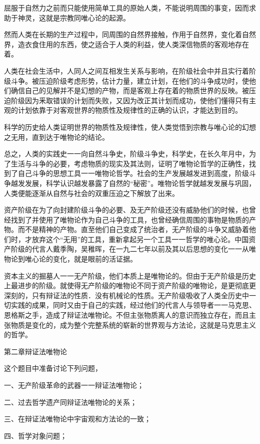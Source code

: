 屈服于自然力之前而只能使用简单工具的原始人类，不能说明周围的事变，因而求助于神灵，这就是宗教同唯心论的起源。

然而人类在长期的生产过程中，同周围的自然界接触，作用于自然界，变化着自然界，造衣食住用的东西，使之适合于人类的利益，使人类深信物质的客观地存在着。

人类在社会生活中，人同人之间互相发生关系与影响，在阶级社会中并且实行着阶级斗争。被压迫阶级考虑形势，估计力量，建立计划，在他们的斗争成功时，使他们确信自己的见解并不是幻想的产物，而是客观上存在着的物质世界的反映。被压迫阶级因为釆取错误的计划而失败，又因为改正其计划而成功，使他们懂得只有主观的计划依靠于对客观世界的物质性及规律性的正确的认识，才能达到目的。

科学的历史给人类证明世界的物质性及规律性，使人类觉悟到宗教与唯心论的幻想之无用，直到达于唯物论的结论。

总之，人类的实践史一一向自然斗争史，阶级斗争史，科学史，在长久年月中，为了生活与斗争的必要，考虑物质的现实及其法则，证明了唯物论哲学的正确性，找到了自己斗争的思想工具一一唯物论哲学。社会的生产发展越发进到高度，阶级斗争越发发展，科学认识越发暴露了自然的“秘密”。唯物论哲学就越发发展与巩固，人类便能逐渐从自然与社会的双重压迫之下解放了出来。

资产阶级在为了向封建阶级斗争的必要、及无产阶级还没有威胁他们的时候，也曾经找到了并使用了唯物论作为自己斗争的工具，也曾经确信周围的事物是物质的产物。而不是精神的产物。直至他们自己变成了统治者，无产阶级的斗争又威胁着他们时，才放弃这个“无用”的工具，重新拿起另一个工具一一哲学的唯心论。中国资产阶级的代言人戴季陶，吴稚晖，在一九二七年以前及其以后思想的变化一一从唯物论到唯心论的变化，就是眼前的活证据。

资本主义的掘墓人一一无产阶级，他们本质上是唯物论的。但由于无产阶级是历史上最进步的阶级。就使得无产阶级的唯物论不同于资产阶级的唯物论，是更彻底更深刻的，只有辩证法的性质．没有机械论的性质。无产阶级吸收了人类全历史中一切实践的成果，同时又由于自己的实践，经过他们的代言人与领导者一一马克思、恩格斯之手，造成了辩证法唯物论。不但主张物质离人的意识而独立存在，而且主张物质是变化的，成为整个完整系统的崭新的世界观与方法论，这就是马克思主义的哲学。

第二章辩证法唯物论

这个题目中准备讨论下列问题，

一、无产阶级革命的武器一一辩证法唯物论；

二、过去哲学遗产同辩证法唯物论的关系；

三、在辩证法唯物论中宇宙观和方法论的一致；

四、哲学对象问题；

